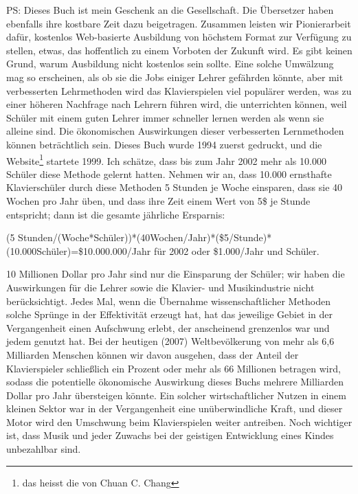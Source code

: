 PS: Dieses Buch ist mein Geschenk an die Gesellschaft.
 Die Übersetzer haben ebenfalls ihre kostbare Zeit dazu beigetragen.
 Zusammen leisten wir Pionierarbeit dafür, kostenlos Web-basierte Ausbildung von höchstem Format zur Verfügung zu stellen, etwas, das hoffentlich zu einem Vorboten der Zukunft wird.
 Es gibt keinen Grund, warum Ausbildung nicht kostenlos sein sollte.
 Eine solche Umwälzung mag so erscheinen, als ob sie die Jobs einiger Lehrer gefährden könnte, aber mit verbesserten Lehrmethoden wird das Klavierspielen viel populärer werden, was zu einer höheren Nachfrage nach Lehrern führen wird, die unterrichten können, weil Schüler mit einem guten Lehrer immer schneller lernen werden als wenn sie alleine sind.
 Die ökonomischen Auswirkungen dieser verbesserten Lernmethoden können beträchtlich sein.
 Dieses Buch wurde 1994 zuerst gedruckt, und die Website\footnote{das heisst die von Chuan C. Chang} startete 1999.
 Ich schätze, dass bis zum Jahr 2002 mehr als 10.000 Schüler diese Methode gelernt hatten.
 Nehmen wir an, dass 10.000 ernsthafte Klavierschüler durch diese Methoden 5 Stunden je Woche einsparen, dass sie 40 Wochen pro Jahr üben, und dass ihre Zeit einem Wert von 5\$ je Stunde entspricht; dann ist die gesamte jährliche Ersparnis:
 

(5 Stunden/(Woche*Schüler))*(40Wochen/Jahr)*(\$5/Stunde)*(10.000Schüler)=\$10.000.000/Jahr für 2002 oder \$1.000/Jahr und Schüler.
 

10 Millionen Dollar pro Jahr sind nur die Einsparung der Schüler; wir haben die Auswirkungen für die Lehrer sowie die Klavier- und Musikindustrie nicht berücksichtigt.
 Jedes Mal, wenn die Übernahme wissenschaftlicher Methoden solche Sprünge in der Effektivität erzeugt hat, hat das jeweilige Gebiet in der Vergangenheit einen Aufschwung erlebt, der anscheinend grenzenlos war und jedem genutzt hat.
 Bei der heutigen (2007) Weltbevölkerung von mehr als 6,6 Milliarden Menschen können wir davon ausgehen, dass der Anteil der Klavierspieler schließlich ein Prozent oder mehr als 66 Millionen betragen wird, sodass die potentielle ökonomische Auswirkung dieses Buchs mehrere Milliarden Dollar pro Jahr übersteigen könnte.
 Ein solcher wirtschaftlicher Nutzen in einem kleinen Sektor war in der Vergangenheit eine unüberwindliche Kraft, und dieser Motor wird den Umschwung beim Klavierspielen weiter antreiben.
 Noch wichtiger ist, dass Musik und jeder Zuwachs bei der geistigen Entwicklung eines Kindes unbezahlbar sind.
 